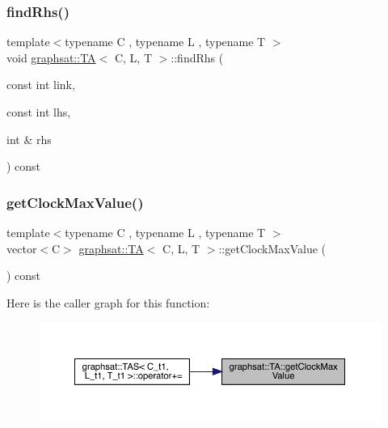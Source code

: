 \subsubsection{\texorpdfstring{findRhs()}{findRhs()}}
{\footnotesize\ttfamily template$<$typename C , typename L , typename T $>$ \\
void \mbox{\hyperlink{classgraphsat_1_1_t_a}{graphsat\+::\+TA}}$<$ C, L, T $>$\+::find\+Rhs (\begin{DoxyParamCaption}\item[{const int}]{link,  }\item[{const int}]{lhs,  }\item[{int \&}]{rhs }\end{DoxyParamCaption}) const\hspace{0.3cm}{\ttfamily [inline]}}

\mbox{\label{classgraphsat_1_1_t_a_aea592f12c9c7cd0232c19a19fa268d25}} 
\subsubsection{\texorpdfstring{getClockMaxValue()}{getClockMaxValue()}}
{\footnotesize\ttfamily template$<$typename C , typename L , typename T $>$ \\
vector$<$C$>$ \mbox{\hyperlink{classgraphsat_1_1_t_a}{graphsat\+::\+TA}}$<$ C, L, T $>$\+::get\+Clock\+Max\+Value (\begin{DoxyParamCaption}{ }\end{DoxyParamCaption}) const\hspace{0.3cm}{\ttfamily [inline]}}

Here is the caller graph for this function\+:
\nopagebreak
\begin{figure}[H]
\begin{center}
\leavevmode
\includegraphics[width=350pt]{classgraphsat_1_1_t_a_aea592f12c9c7cd0232c19a19fa268d25_icgraph}
\end{center}
\end{figure}
\mbox{\label{classgraphsat_1_1_t_a_a5c6fed7d2a3e06cb221049fb42eb1800}} 
